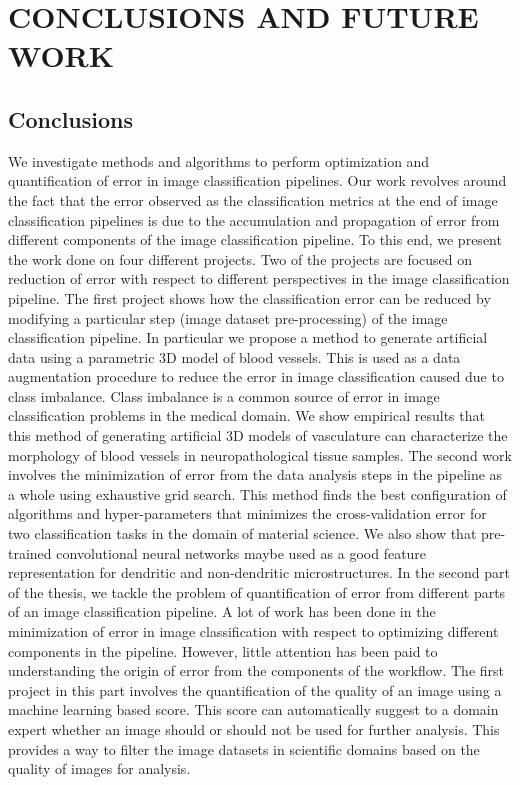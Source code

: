 \chapter{CONCLUSIONS AND FUTURE WORK}
\label{chap:conclusions}
\section{Conclusions}
We investigate methods and algorithms to perform optimization and quantification of error in image classification pipelines. Our work revolves around the fact that the error observed as the classification metrics at the end of image classification pipelines is due to the accumulation and propagation of error from different components of the image classification pipeline. To this end, we present the work done on four different projects. Two of the projects are focused on reduction of error with respect to different perspectives in the image classification pipeline. 
The first project shows how the classification error can be reduced by modifying a particular step (image dataset pre-processing) of the image classification pipeline. In particular we propose a method to generate artificial data using a parametric 3D model of blood vessels. This is used as a data augmentation procedure to reduce the error in image classification caused due to class imbalance. Class imbalance is a common source of error in image classification problems in the medical domain. We show empirical results that this method of generating artificial 3D models of vasculature can characterize the morphology of blood vessels in neuropathological tissue samples.  
The second work involves the minimization of error from the data analysis steps in the pipeline as a whole using exhaustive grid search. This method finds the best configuration of algorithms and hyper-parameters that minimizes the cross-validation error for two classification tasks in the domain of material science. We also show that pre-trained convolutional neural networks maybe used  as a good feature representation for dendritic and non-dendritic microstructures. 
In the second part of the thesis, we tackle the problem of quantification of error from different parts of an image classification pipeline. A lot of work has been done in the minimization of error in image classification with respect to optimizing different components in the pipeline. However, little attention has been paid to understanding the origin of error from the components of the workflow. 
The first project in this part involves the quantification of the quality of an image using a machine learning based score. This score can automatically suggest to a domain expert whether an image should or should not be used for further analysis. This provides a way to filter the image datasets in scientific domains based on the quality of images for analysis.
